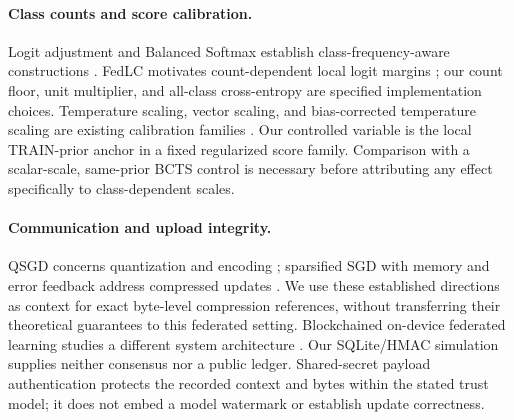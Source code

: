 \paragraph{Class counts and score calibration.}
Logit adjustment and Balanced Softmax establish class-frequency-aware constructions \cite{menon2021logitadjust,ren2020balanced}. FedLC motivates count-dependent local logit margins \cite{zhang2022fedlc}; our count floor, unit multiplier, and all-class cross-entropy are specified implementation choices. Temperature scaling, vector scaling, and bias-corrected temperature scaling are existing calibration families \cite{guo2017calibration,alexandari2020labelshift}. Our controlled variable is the local TRAIN-prior anchor in a fixed regularized score family. Comparison with a scalar-scale, same-prior BCTS control is necessary before attributing any effect specifically to class-dependent scales.

\paragraph{Communication and upload integrity.}
QSGD concerns quantization and encoding \cite{alistarh2017qsgd}; sparsified SGD with memory and error feedback address compressed updates \cite{stich2018sparsified,karimireddy2019errorfeedback}. We use these established directions as context for exact byte-level compression references, without transferring their theoretical guarantees to this federated setting. Blockchained on-device federated learning studies a different system architecture \cite{kim2020blockfl}. Our SQLite/HMAC simulation supplies neither consensus nor a public ledger. Shared-secret payload authentication \cite{rfc2104} protects the recorded context and bytes within the stated trust model; it does not embed a model watermark or establish update correctness.
